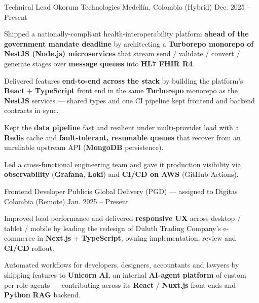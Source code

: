 \newcommand{\quotes}[1]{``#1''}

\begin{cventries}

  \cventry
  {Technical Lead}
  {Okorum Technologies}
  {Medellín, Colombia (Hybrid)}
  {Dec. 2025 -- Present}
  {
    \begin{cvitems}
      \item {Shipped a nationally-compliant health-interoperability platform \textbf{ahead of the government mandate deadline} by architecting a \textbf{Turborepo monorepo of NestJS (Node.js) microservices} that stream send / validate / convert / generate stages over \textbf{message queues} into \textbf{HL7 FHIR R4}.}
      \item {Delivered features \textbf{end-to-end across the stack} by building the platform's \textbf{React} + \textbf{TypeScript} front end in the same \textbf{Turborepo} monorepo as the \textbf{NestJS} services --- shared types and one CI pipeline kept frontend and backend contracts in sync.}
      \item {Kept the \textbf{data pipeline} fast and resilient under multi-provider load with a \textbf{Redis} cache and \textbf{fault-tolerant, resumable queues} that recover from an unreliable upstream API (\textbf{MongoDB} persistence).}
      \item {Led a cross-functional engineering team and gave it production visibility via \textbf{observability} (\textbf{Grafana}, \textbf{Loki}) and \textbf{CI/CD on AWS} (GitHub Actions).}
    \end{cvitems}
  }

  \cventry
  {Frontend Developer}
  {Publicis Global Delivery (PGD) — assigned to Digitas}
  {Colombia (Remote)}
  {Jan. 2025 -- Present}
  {
    \begin{cvitems}
      \item {Improved load performance and delivered \textbf{responsive UX} across desktop / tablet / mobile by leading the redesign of Duluth Trading Company's e-commerce in \textbf{Next.js} + \textbf{TypeScript}, owning implementation, review and \textbf{CI/CD} rollout.}
      \item {Automated workflows for developers, designers, accountants and lawyers by shipping features to \textbf{Unicorn AI}, an internal \textbf{AI-agent platform} of custom per-role agents --- contributing across its \textbf{React} / \textbf{Nuxt.js} front ends and \textbf{Python} \textbf{RAG} backend.}
    \end{cvitems}
  }


\end{cventries}
